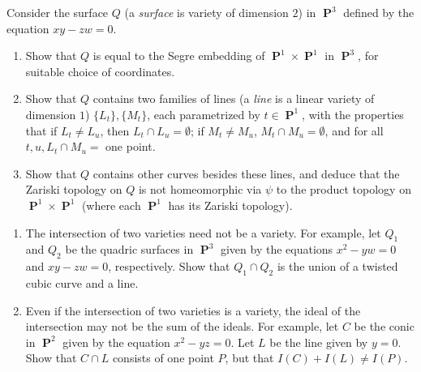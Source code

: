 \documentclass{hw_pset} %
\DeclareMathOperator{\pp}{\mathbf{P}} %
\begin{document}
\begin{solution}
    
\end{solution}

\begin{exercise}[2.15]
    Consider the surface $Q$ (a \emph{surface} is variety of dimension $2$) in
    $\pp^3$ defined by the equation $xy-zw = 0$.
    \begin{enumerate} 
      \item Show that $Q$ is equal to the Segre embedding of $\pp^1 \times \pp^1$ in
        $\pp^3$, for suitable choice of coordinates.
      \item Show that $Q$ contains two families of lines (a \emph{line} is a
        linear variety of dimension $1$) $\{L_t\}, \{M_t\}$, each parametrized by
        $t \in \pp^1$, with the properties that if $L_t \ne L_u$, then
        $L_t \cap L_u = \emptyset$; if $M_t \ne M_u$, $M_t \cap M_u = \emptyset$,
        and for all $t,u, L_t \cap M_u =$ one point. 
      \item Show that $Q$ contains other curves besides these lines, and deduce that
        the Zariski topology on $Q$ is not homeomorphic via $\psi$ to the product
        topology on $\pp^1 \times \pp^1$ (where each $\pp^1$ has its Zariski
        topology). 
    \end{enumerate}
\end{exercise}

\begin{solution}
    
\end{solution}

\begin{exercise}[2.16]
    \begin{enumerate}
        \item The intersection of two varieties need not be a variety. For example,
        let $Q_1$ and $Q_2$ be the quadric surfaces in $\pp^3$ given by the
        equations $x^2-yw = 0$ and $xy - zw =0$, respectively. Show that $Q_1 \cap
        Q_2$ is the union of a twisted cubic curve and a line.
        
        \item Even if the intersection of two varieties is a variety, the ideal of the
        intersection may not be the sum of the ideals. For example, let $C$ be the
        conic in $\pp^2$ given by the equation $x^2-yz = 0$. Let $L$ be the line
        given by $y = 0$. Show that $C \cap L$ consists of one point $P$, but that
        $I(C) + I(L) \ne I(P)$. 
    \end{enumerate}
\end{exercise}
\end{document}
